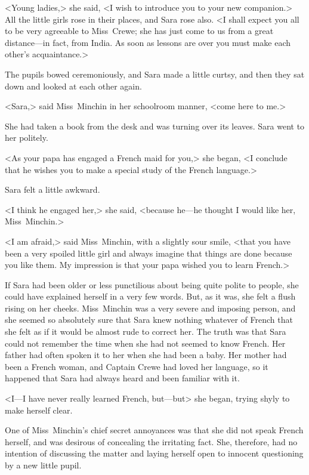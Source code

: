 <Young ladies,> she said, <I wish to introduce you to your new companion.> All the little girls rose in their places, and Sara rose also. <I shall expect you all to be very agreeable to Miss~Crewe; she has just come to us from a great distance—in fact, from India. As soon as lessons are over you must make each other's acquaintance.>

The pupils bowed ceremoniously, and Sara made a little curtsy, and then they sat down and looked at each other again.

<Sara,> said Miss~Minchin in her schoolroom manner, <come here to me.>

She had taken a book from the desk and was turning over its leaves. Sara went to her politely.

<As your papa has engaged a French maid for you,> she began, <I conclude that he wishes you to make a special study of the French language.>

Sara felt a little awkward.

<I think he engaged her,> she said, <because he—he thought I would like her, Miss~Minchin.>

<I am afraid,> said Miss~Minchin, with a slightly sour smile, <that you have been a very spoiled little girl and always imagine that things are done because you like them. My impression is that your papa wished you to learn French.>

If Sara had been older or less punctilious about being quite polite to people, she could have explained herself in a very few words. But, as it was, she felt a flush rising on her cheeks. Miss~Minchin was a very severe and imposing person, and she seemed so absolutely sure that Sara knew nothing whatever of French that she felt as if it would be almost rude to correct her. The truth was that Sara could not remember the time when she had not seemed to know French. Her father had often spoken it to her when she had been a baby. Her mother had been a French woman, and Captain Crewe had loved her language, so it happened that Sara had always heard and been familiar with it.

<I—I have never really learned French, but—but\longdash> she began, trying shyly to make herself clear.

One of Miss~Minchin's chief secret annoyances was that she did not speak French herself, and was desirous of concealing the irritating fact. She, therefore, had no intention of discussing the matter and laying herself open to innocent questioning by a new little pupil.

